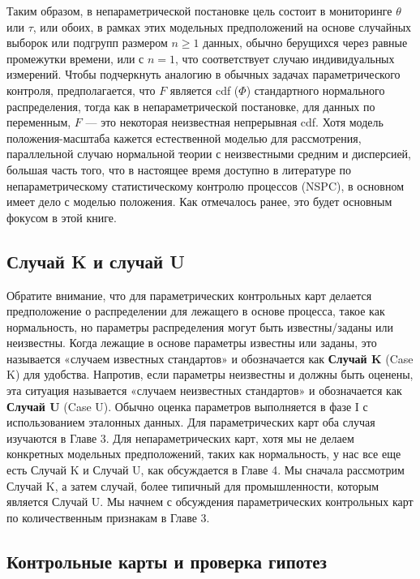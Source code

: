 Таким образом, в непараметрической постановке цель состоит в мониторинге \(\theta\) или \(\tau\), или обоих, в рамках этих модельных предположений на основе случайных выборок или подгрупп размером \(n \geq 1\) данных, обычно берущихся через равные промежутки времени, или с \(n = 1\), что соответствует случаю индивидуальных измерений. Чтобы подчеркнуть аналогию в обычных задачах параметрического контроля, предполагается, что \(F\) является cdf (\(\Phi\)) стандартного нормального распределения, тогда как в непараметрической постановке, для данных по переменным, \(F\) — это некоторая неизвестная непрерывная cdf. Хотя модель положения-масштаба кажется естественной моделью для рассмотрения, параллельной случаю нормальной теории с неизвестными средним и дисперсией, большая часть того, что в настоящее время доступно в литературе по непараметрическому статистическому контролю процессов (NSPC), в основном имеет дело с моделью положения. Как отмечалось ранее, это будет основным фокусом в этой книге.

\subsection{Случай K и случай U}

Обратите внимание, что для параметрических контрольных карт делается предположение о распределении для лежащего в основе процесса, такое как нормальность, но параметры распределения могут быть известны/заданы или неизвестны. Когда лежащие в основе параметры известны или заданы, это называется «случаем известных стандартов» и обозначается как \textbf{Случай K} (Case K) для удобства. Напротив, если параметры неизвестны и должны быть оценены, эта ситуация называется «случаем неизвестных стандартов» и обозначается как \textbf{Случай U} (Case U). Обычно оценка параметров выполняется в фазе I с использованием эталонных данных. Для параметрических карт оба случая изучаются в Главе 3. Для непараметрических карт, хотя мы не делаем конкретных модельных предположений, таких как нормальность, у нас все еще есть Случай K и Случай U, как обсуждается в Главе 4. Мы сначала рассмотрим Случай K, а затем случай, более типичный для промышленности, которым является Случай U. Мы начнем с обсуждения параметрических контрольных карт по количественным признакам в Главе 3.

\subsection{Контрольные карты и проверка гипотез}

